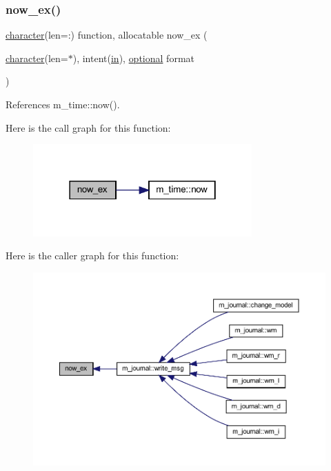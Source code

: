 \subsubsection{\texorpdfstring{now\+\_\+ex()}{now\_ex()}}
{\footnotesize\ttfamily \hyperlink{option__stopwatch_83_8txt_abd4b21fbbd175834027b5224bfe97e66}{character}(len=\+:) function, allocatable now\+\_\+ex (\begin{DoxyParamCaption}\item[{\hyperlink{option__stopwatch_83_8txt_abd4b21fbbd175834027b5224bfe97e66}{character}(len=$\ast$), intent(\hyperlink{M__journal_83_8txt_afce72651d1eed785a2132bee863b2f38}{in}), \hyperlink{option__stopwatch_83_8txt_aa4ece75e7acf58a4843f70fe18c3ade5}{optional}}]{format }\end{DoxyParamCaption})\hspace{0.3cm}{\ttfamily [private]}}



References m\+\_\+time\+::now().

Here is the call graph for this function\+:
\nopagebreak
\begin{figure}[H]
\begin{center}
\leavevmode
\includegraphics[width=238pt]{M__time_8f90_a09223e2da0c23850fad035407582fd68_cgraph}
\end{center}
\end{figure}
Here is the caller graph for this function\+:
\nopagebreak
\begin{figure}[H]
\begin{center}
\leavevmode
\includegraphics[width=350pt]{M__time_8f90_a09223e2da0c23850fad035407582fd68_icgraph}
\end{center}
\end{figure}
\mbox{\label{M__time_8f90_a7d6b522799e158810bf530a1dedbc03e}} 
